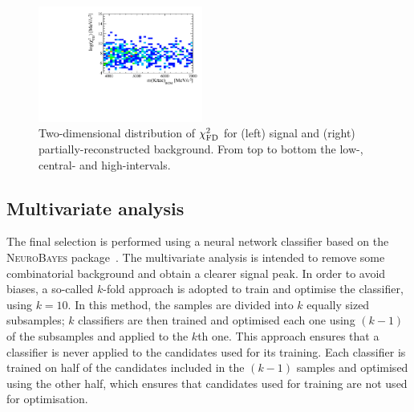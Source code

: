 \begin{figure}[t!]
\includegraphics[width=0.48\textwidth]{RKst/figs/HOP/HOP_bkg_high.pdf}
\caption{Two-dimensional distribution of $\chi^2_{\rm FD}$ \vs \mbcm for (left) \BdToKstee signal and (right) partially-reconstructed background.
From top to bottom the low-, central- and high-\qsq intervals.}
\label{fig:hop}

\end{figure}


\subsection{Multivariate analysis}
\label{sec:RKst_mva}

The final selection is performed using a neural network classifier based on the \mbox{\textsc{NeuroBayes}}
package~\cite{Feindt:2006pm,feindt-2004}. The multivariate analysis is intended to remove
some combinatorial background and obtain a clearer signal peak. In order to avoid biases, a so-called $k$-fold
approach is adopted to train and optimise the classifier, using $k=10$. In this method, the samples are divided into 
$k$ equally sized subsamples; $k$ classifiers are then trained and optimised each one using $(k-1)$ of the subsamples 
and applied to the $k$th one. This approach ensures that a classifier is never applied to the candidates used for its training.
Each classifier is trained on half of the candidates included in the $(k-1)$ samples and optimised using the other half,
which ensures that candidates used for training are not used for optimisation.


